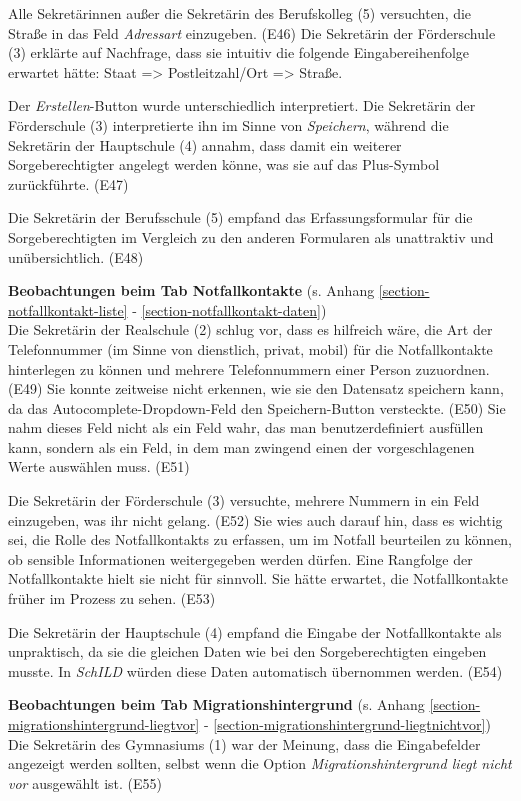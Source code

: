 Alle Sekretärinnen außer die Sekretärin des Berufskolleg (5) versuchten, die Straße in das Feld \textit{Adressart} einzugeben. (E46) Die Sekretärin der Förderschule (3) erklärte auf Nachfrage, dass sie intuitiv die folgende Eingabereihenfolge erwartet hätte: Staat => Postleitzahl/Ort => Straße.

Der \textit{Erstellen}-Button wurde unterschiedlich interpretiert. Die Sekretärin der Förderschule (3) interpretierte ihn im Sinne von \textit{Speichern}, während die Sekretärin der Hauptschule (4) annahm, dass damit ein weiterer Sorgeberechtigter angelegt werden könne, was sie auf das Plus-Symbol zurückführte. (E47)

Die Sekretärin der Berufsschule (5) empfand das Erfassungsformular für die Sorgeberechtigten im Vergleich zu den anderen Formularen als \glqq unattraktiv\grqq{} und \glqq unübersichtlich\grqq{}. (E48)

\textbf{Beobachtungen beim Tab \glqq Notfallkontakte\grqq{}} (s. Anhang \ref{section-notfallkontakt-liste} - \ref{section-notfallkontakt-daten})\\
Die Sekretärin der Realschule (2) schlug vor, dass es hilfreich wäre, die Art der Telefonnummer (im Sinne von dienstlich, privat, mobil) für die Notfallkontakte hinterlegen zu können und mehrere Telefonnummern einer Person zuzuordnen. (E49) Sie konnte zeitweise nicht erkennen, wie sie den Datensatz speichern kann, da das Autocomplete-Dropdown-Feld den Speichern-Button versteckte. (E50) Sie nahm dieses Feld nicht als ein Feld wahr, das man benutzerdefiniert ausfüllen kann, sondern als ein Feld, in dem man zwingend einen der vorgeschlagenen Werte auswählen muss. (E51)

Die Sekretärin der Förderschule (3) versuchte, mehrere Nummern in ein Feld einzugeben, was ihr nicht gelang. (E52) Sie wies auch darauf hin, dass es wichtig sei, die Rolle des Notfallkontakts zu erfassen, um im Notfall beurteilen zu können, ob sensible Informationen weitergegeben werden dürfen. Eine Rangfolge der Notfallkontakte hielt sie nicht für sinnvoll. Sie hätte erwartet, die Notfallkontakte früher im Prozess zu sehen. (E53)

Die Sekretärin der Hauptschule (4) empfand die Eingabe der Notfallkontakte als unpraktisch, da sie die gleichen Daten wie bei den Sorgeberechtigten eingeben musste. In \textit{SchILD} würden diese Daten automatisch übernommen werden. (E54)

\textbf{Beobachtungen beim Tab \glqq Migrationshintergrund\grqq{}} (s. Anhang \ref{section-migrationshintergrund-liegtvor} - \ref{section-migrationshintergrund-liegtnichtvor})\\
Die Sekretärin des Gymnasiums (1) war der Meinung, dass die Eingabefelder angezeigt werden sollten, selbst wenn die Option \textit{Migrationshintergrund liegt nicht vor\grqq} ausgewählt ist. (E55)

